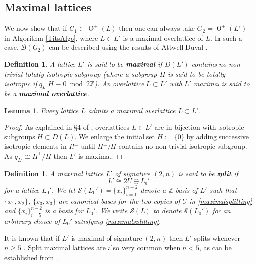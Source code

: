 \documentclass[12pt, a4paper]{article}
\newtheorem{lemma}[theorem]{Lemma}
\newtheorem{defn}[theorem]{Definition}
\newcommand{\ZZ}{\mathbb{Z}}
\newcommand{\bc}{\mathcal{B}}
\newcommand{\Sc}{\mathcal{S}}
\newcommand{\opn}{\operatorname}
\newcommand{\op}{\oplus}
\begin{document}
\subsection{Maximal lattices}
We now show that if $G_1 \subset \opn{O}^+(L)$ then one can always take $G_2 = \opn{O}^+(L')$ in Algorithm \ref{TitsAlgo}, where $L \subset L'$ is a maximal overlattice of $L$.
In such a case, $\bc(G_2)$ can be described using the results of  Attwell-Duval \cite{Attwell-Duval-Number, Attwell-Duval, Attwell-Duval-Topological}.
\begin{defn} A lattice $L'$ is said to be \textbf{maximal} if $D(L')$ contains no non-trivial totally isotropic subgroup
  (where a subgroup $H$ is said to be totally isotropic if $q_L \vert H \equiv 0 \bmod{ 2 \ZZ}$).
  An overlattice $L \subset L'$ with $L'$ maximal is said to be a \textbf{maximal overlattice}.
\end{defn}
\begin{lemma}\label{maximal-overlattice-lemma}
  Every lattice $L$ admits a maximal overlattice $L \subset L'$.
\end{lemma}
\begin{proof}
  As explained in \S4 of \cite{Nikulin}, overlattices $L \subset L'$ are in bijection with isotropic subgroups $H \subset D(L)$.
  We enlarge the initial set $H := \{0 \}$ by adding successive  isotropic elements in $H^{\perp}$ until $H^{\perp}/H$ contains no non-trivial isotropic subgroup.
  As $q_{L'} \cong H^{\perp}/H$ \cite{Nikulin} then $L'$ is maximal.
\end{proof}
\begin{defn}
  A maximal lattice $L'$ of signature $(2,n)$ is said to be \textbf{split} if
  \begin{equation}\label{maximalsplitting}
  L' \cong 2U \op L_0'
  \end{equation}
  for a lattice $L_0'$.
  We let $\Sc(L_0') = \{x_i\}_{i=1}^{n+2}$ denote a $\ZZ$-basis of $L'$ such that $\{x_1, x_2\}$, $\{x_3, x_3 \}$ are canonical bases for the two copies of $U$ in \eqref{maximalsplitting} and $\{x_i\}_{i=5}^{n+2}$ is a basis for $L_0'$.
  We write $\Sc(L)$ to denote $\Sc(L_0')$ for an arbitrary choice of $L_0'$ satisfying \eqref{maximalsplitting}.
\end{defn}
It is known that if $L'$ is maximal of signature $(2,n)$  then $L'$ splits whenever $n \geq 5$ \cite{Attwell-Duval}.
Split maximal lattices are also  very common when $n < 5$, as can be established from \cite[Corollary 1.13.5]{Nikulin}.
\\
\\
\end{document}
